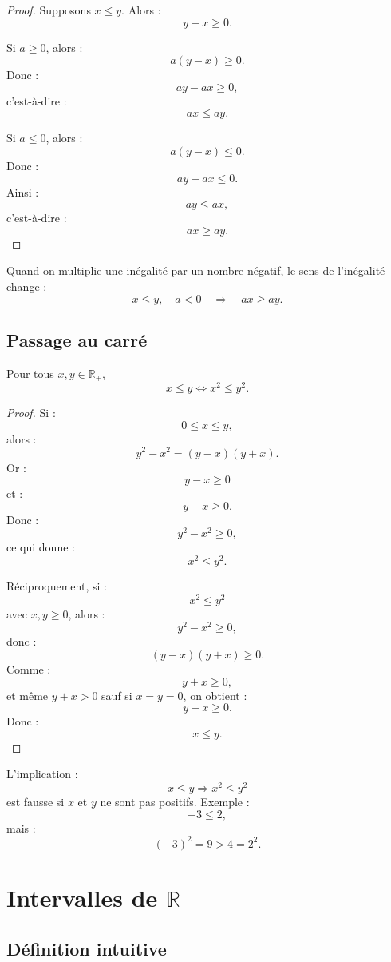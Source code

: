 \documentclass[11pt,a4paper]{article}
\newcommand{\R}{\mathbb R}
\newcommand{\ssi}{\Longleftrightarrow}
\newcommand{\implique}{\Longrightarrow}
\begin{document}
\begin{proof}
Supposons \(x\leq y\). Alors :
\[
y-x\geq0.
\]

Si \(a\geq0\), alors :
\[
a(y-x)\geq0.
\]
Donc :
\[
ay-ax\geq0,
\]
c'est-à-dire :
\[
ax\leq ay.
\]

Si \(a\leq0\), alors :
\[
a(y-x)\leq0.
\]
Donc :
\[
ay-ax\leq0.
\]
Ainsi :
\[
ay\leq ax,
\]
c'est-à-dire :
\[
ax\geq ay.
\]
\end{proof}

\begin{erreurbox}
Quand on multiplie une inégalité par un nombre négatif, le sens de l'inégalité change :
\[
x\leq y,\quad a<0
\quad\implique\quad
ax\geq ay.
\]
\end{erreurbox}

\subsection{Passage au carré}

\begin{theorembox}
Pour tous \(x,y\in\R_+\),
\[
x\leq y \ssi x^2\leq y^2.
\]
\end{theorembox}

\begin{proof}
Si :
\[
0\leq x\leq y,
\]
alors :
\[
y^2-x^2=(y-x)(y+x).
\]
Or :
\[
y-x\geq0
\]
et :
\[
y+x\geq0.
\]
Donc :
\[
y^2-x^2\geq0,
\]
ce qui donne :
\[
x^2\leq y^2.
\]

Réciproquement, si :
\[
x^2\leq y^2
\]
avec \(x,y\geq0\), alors :
\[
y^2-x^2\geq0,
\]
donc :
\[
(y-x)(y+x)\geq0.
\]
Comme :
\[
y+x\geq0,
\]
et même \(y+x>0\) sauf si \(x=y=0\), on obtient :
\[
y-x\geq0.
\]
Donc :
\[
x\leq y.
\]
\end{proof}

\begin{erreurbox}
L'implication :
\[
x\leq y \implique x^2\leq y^2
\]
est fausse si \(x\) et \(y\) ne sont pas positifs.  
Exemple :
\[
-3\leq 2,
\]
mais :
\[
(-3)^2=9>4=2^2.
\]
\end{erreurbox}

\section{Intervalles de \(\R\)}

\subsection{Définition intuitive}
\end{document}
